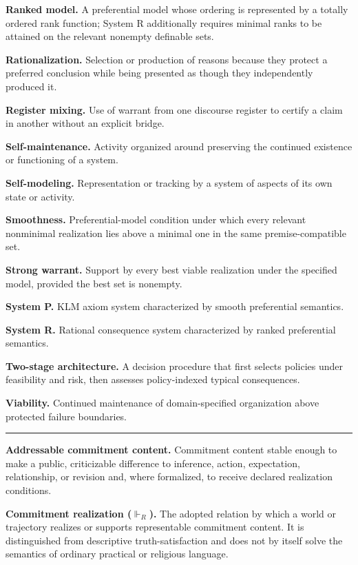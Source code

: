 \documentclass[
  11pt,
]{article}
\begin{document}
\textbf{Ranked model.} A preferential model whose ordering is
represented by a totally ordered rank function; System R additionally
requires minimal ranks to be attained on the relevant nonempty definable
sets.

\textbf{Rationalization.} Selection or production of reasons because
they protect a preferred conclusion while being presented as though they
independently produced it.

\textbf{Register mixing.} Use of warrant from one discourse register to
certify a claim in another without an explicit bridge.

\textbf{Self-maintenance.} Activity organized around preserving the
continued existence or functioning of a system.

\textbf{Self-modeling.} Representation or tracking by a system of
aspects of its own state or activity.

\textbf{Smoothness.} Preferential-model condition under which every
relevant nonminimal realization lies above a minimal one in the same
premise-compatible set.

\textbf{Strong warrant.} Support by every best viable realization under
the specified model, provided the best set is nonempty.

\textbf{System P.} KLM axiom system characterized by smooth preferential
semantics.

\textbf{System R.} Rational consequence system characterized by ranked
preferential semantics.

\textbf{Two-stage architecture.} A decision procedure that first selects
policies under feasibility and risk, then assesses policy-indexed
typical consequences.

\textbf{Viability.} Continued maintenance of domain-specified
organization above protected failure boundaries.

\begin{center}\rule{0.5\linewidth}{0.5pt}\end{center}

\textbf{Addressable commitment content.} Commitment content stable
enough to make a public, criticizable difference to inference, action,
expectation, relationship, or revision and, where formalized, to receive
declared realization conditions.

\textbf{Commitment realization (\(\Vdash_R\)).} The adopted relation by
which a world or trajectory realizes or supports representable
commitment content. It is distinguished from descriptive
truth-satisfaction and does not by itself solve the semantics of
ordinary practical or religious language.
\end{document}
